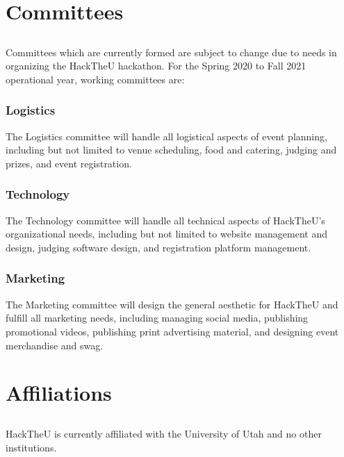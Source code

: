 \documentclass[12pt]{article}
\begin{document}
\section{Committees}

\subsection{} Committees which are currently formed are subject to change due to 
needs in organizing the HackTheU hackathon. For the Spring 2020 to Fall 2021 operational
year, working committees are:

\subsubsection{Logistics}

\noindent The Logistics committee will handle all logistical aspects of event planning,
including but not limited to venue scheduling, food and catering, judging and prizes,
and event registration.

\subsubsection{Technology}

\noindent The Technology committee will handle all technical aspects of HackTheU's 
organizational needs, including but not limited to website management and design,
judging software design, and registration platform management.

\subsubsection{Marketing}

\noindent The Marketing committee will design the general aesthetic for HackTheU and 
fulfill all marketing needs, including managing social media, publishing
promotional videos, publishing print advertising material, and designing event
merchandise and swag.

\section{Affiliations}

\subsection{} HackTheU is currently affiliated with the University of Utah
and no other institutions.
\end{document}
